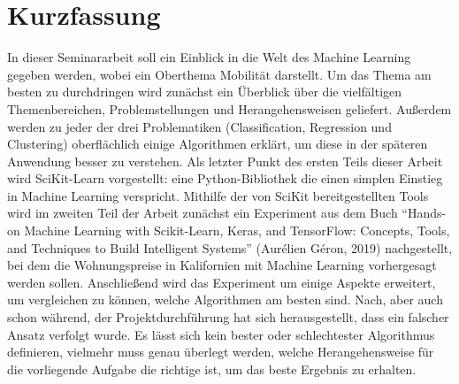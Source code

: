 \section*{Kurzfassung}
In dieser Seminararbeit soll ein Einblick in die Welt des Machine Learning gegeben werden, wobei ein Oberthema Mobilität darstellt. 
Um das Thema am besten zu durchdringen wird zunächst ein Überblick über die vielfältigen Themenbereichen, Problemstellungen und Herangehensweisen geliefert. Außerdem werden zu jeder der drei Problematiken (Classification, Regression und Clustering) oberflächlich einige Algorithmen erklärt, um diese in der späteren Anwendung besser zu verstehen.
Als letzter Punkt des ersten Teils dieser Arbeit wird SciKit-Learn vorgestellt: eine Python-Bibliothek die einen simplen Einstieg in Machine Learning verspricht.
Mithilfe der von SciKit bereitgestellten Tools wird im zweiten Teil der Arbeit zunächst ein Experiment aus dem Buch “Hands-on Machine Learning with Scikit-Learn, Keras, and TensorFlow: Concepts, Tools, and Techniques to Build Intelligent Systems” (Aurélien Géron, 2019) nachgestellt, bei dem die Wohnungspreise in Kalifornien mit Machine Learning vorhergesagt werden sollen. Anschließend wird das Experiment um einige Aspekte erweitert, um vergleichen zu können, welche Algorithmen am besten sind. 
Nach, aber auch schon während, der Projektdurchführung hat sich herausgestellt, dass ein falscher Ansatz verfolgt wurde. Es lässt sich kein bester oder schlechtester Algorithmus definieren, vielmehr muss genau überlegt werden, welche Herangehensweise für die vorliegende Aufgabe die richtige ist, um das beste Ergebnis zu erhalten.

\vfill\vfill\vfill\vfill\vfill\vfill
